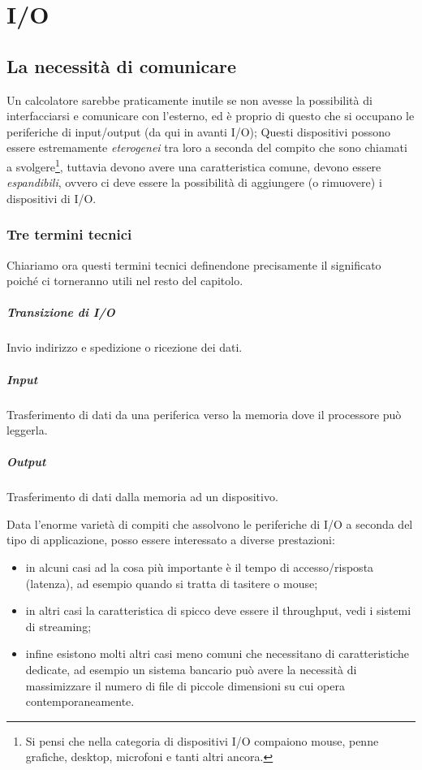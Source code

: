 \documentclass[class=book, crop=false, oneside]{standalone}
\begin{document}
\chapter{I/O}

\section{La necessità di comunicare}
Un calcolatore sarebbe praticamente inutile se non avesse la possibilità di interfacciarsi e comunicare con l'esterno, ed è proprio di questo che si occupano le periferiche di input/output (da qui in avanti I/O); Questi dispositivi possono essere estremamente \emph{eterogenei} tra loro a seconda del compito che sono chiamati a svolgere\footnote{Si pensi che nella categoria di dispositivi I/O compaiono mouse, penne grafiche, desktop, microfoni e tanti altri ancora.}, tuttavia devono avere una caratteristica comune, devono essere \emph{espandibili}, ovvero ci deve essere la possibilità di aggiungere (o rimuovere) i dispositivi di I/O.

\subsection*{Tre termini tecnici}
Chiariamo ora questi termini tecnici definendone precisamente il significato poiché ci torneranno utili nel resto del capitolo.
\paragraph{Transizione di I/O} Invio indirizzo e spedizione o ricezione dei dati.
\paragraph{Input} Trasferimento di dati da una periferica verso la memoria dove il processore può leggerla.
\paragraph{Output} Trasferimento di dati dalla memoria ad un dispositivo.

Data l'enorme varietà di compiti che assolvono le periferiche di I/O a  seconda del tipo di applicazione, posso essere interessato a diverse prestazioni:
\begin{itemize}
	\item in alcuni casi ad la cosa più importante è il tempo di accesso/risposta (latenza), ad esempio quando si tratta di tasitere o mouse;
	\item in altri casi la caratteristica di spicco deve essere il throughput, vedi i sistemi di streaming;
	\item infine esistono molti altri casi meno comuni che necessitano di caratteristiche dedicate, ad esempio un sistema bancario può avere la necessità di massimizzare il numero di file di piccole dimensioni su cui opera contemporaneamente.
\end{itemize}
\end{document}
